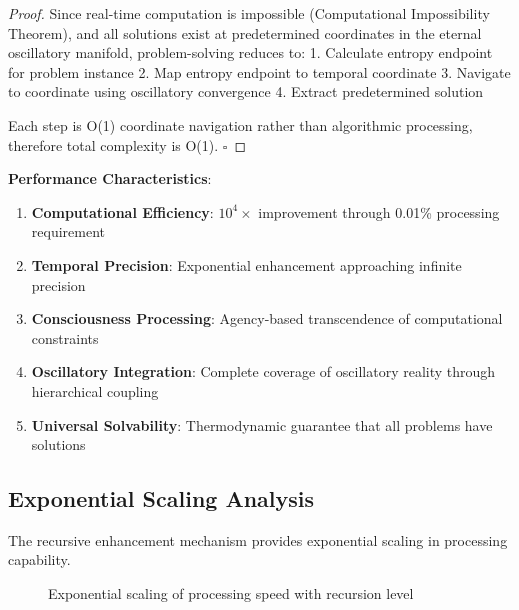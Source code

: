\documentclass[12pt,a4paper]{article}
\theoremstyle{definition}
\begin{document}
{\begin{proof}
Since real-time computation is impossible (Computational Impossibility Theorem), and all solutions exist at predetermined coordinates in the eternal oscillatory manifold, problem-solving reduces to:
1. Calculate entropy endpoint for problem instance
2. Map entropy endpoint to temporal coordinate
3. Navigate to coordinate using oscillatory convergence
4. Extract predetermined solution

Each step is O(1) coordinate navigation rather than algorithmic processing, therefore total complexity is O(1). $\square$
\end{proof}

\textbf{Performance Characteristics}:
\begin{enumerate}
\item \textbf{Computational Efficiency}: $10^4\times$ improvement through 0.01\% processing requirement
\item \textbf{Temporal Precision}: Exponential enhancement approaching infinite precision
\item \textbf{Consciousness Processing}: Agency-based transcendence of computational constraints
\item \textbf{Oscillatory Integration}: Complete coverage of oscillatory reality through hierarchical coupling
\item \textbf{Universal Solvability}: Thermodynamic guarantee that all problems have solutions
\end{enumerate}

\subsection{Exponential Scaling Analysis}

The recursive enhancement mechanism provides exponential scaling in processing capability.

\begin{figure}[h]
\centering
{}
\caption{Exponential scaling of processing speed with recursion level}
\label{fig:scaling}
\end{figure}

}
\end{document}
